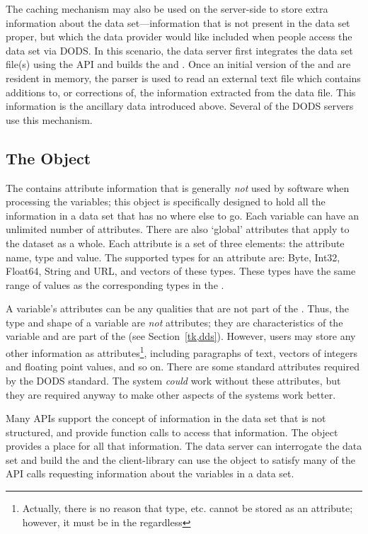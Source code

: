 The caching mechanism may also be used on the server-side to
store extra information about the data set---information that is not
present in the data set proper, but which the data provider would like
included when people access the data set via DODS.  In this scenario,
the data server first integrates the data set file(s) using the API
and builds the  and . Once an initial version of
the  and  are resident in memory, the parser is
used to read an external text file which contains additions to, or
corrections of, the information extracted from the data file. This
information is the ancillary data introduced above. Several of the
DODS servers use this mechanism. 

\subsection{The  Object}
\label{tk,das}

The  contains attribute information that is generally
\emph{not} used by software when processing the variables; this object
is specifically designed to hold all the information in a data set
that has no where else to go.  Each variable can have an unlimited
number of attributes. There are also `global' attributes that apply to
the dataset as a whole. Each attribute is a set of three elements: the
attribute name, type and value. The supported types for an attribute
are: Byte, Int32, Float64, String and URL, and vectors of these types.
These types have the same range of values as the corresponding types
in the \dap.

A variable's attributes can be any qualities that are not part of the
.  Thus, the type and shape of a variable are \emph{not}
attributes; they are characteristics of the variable and are part of
the  (see Section~\ref{tk,dds}). However, users may
store any other information as attributes\footnote{Actually, there is
no reason that type, etc. cannot be stored as an attribute; however,
it must be in the  regardless}, including paragraphs of
text, vectors of integers and floating point values, and so on. There
are some standard attributes required by the DODS standard.  The
system \emph{could} work without these attributes, but they are
required anyway to make other aspects of the systems work better.

Many APIs support the concept of information in the data set that is
not structured, and provide function calls to access that information.
The  object provides a place for all that information. The
data server can interrogate the data set and build the  and
the client-library can use the  object to satisfy many of
the API calls requesting information about the variables in a data
set.

